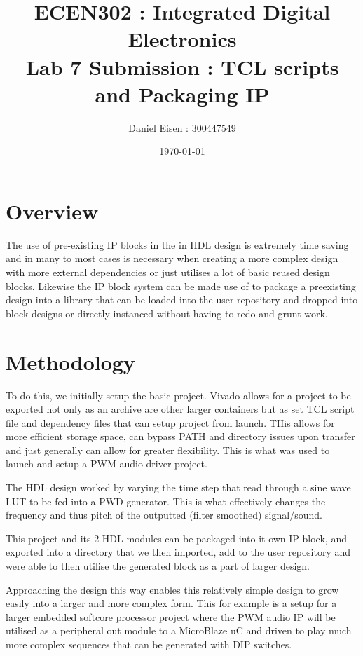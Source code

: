 \documentclass[11pt]{article}
\title{ECEN302 : Integrated Digital Electronics \\ Lab 7 Submission : TCL scripts and Packaging IP}
\author{Daniel Eisen : 300447549}
\date{\today}
\begin{document}
\begin{preview}
\maketitle
\section{Overview}
The use of pre-existing IP blocks in the in HDL design is extremely time saving and in many to most cases is necessary when creating a more complex design with more external dependencies or just utilises a lot of basic reused design blocks. Likewise the IP block system can be made use of to package a preexisting design into a library that can be loaded into the user repository and dropped into block designs or directly instanced without having to redo and grunt work. 
\section{Methodology}
To do this, we initially setup the basic project. Vivado allows for a project to be exported not only as an archive are other larger containers but as set TCL script file and dependency files that can setup project from launch. THis allows for more efficient storage space, can bypass PATH and directory issues upon transfer and just generally can allow for greater flexibility. This is what was used to launch and setup a PWM audio driver project.

The HDL design worked by varying the time step that read through a sine wave LUT to be fed into a PWD generator. This is what effectively changes the frequency and thus pitch of the outputted (filter smoothed) signal/sound.

This project and its 2 HDL modules can be packaged into it own IP block, and exported into a directory that we then imported, add to the user repository and were able to then utilise the generated block as a part of larger design. 

Approaching the design this way enables this relatively simple design to grow easily into a larger and more complex form. This for example is a setup for a larger embedded softcore processor project where the PWM audio IP will be utilised as a peripheral out module to a MicroBlaze uC and driven to play much more complex sequences that can be generated with DIP switches.  



\end{preview}
\end{document}
